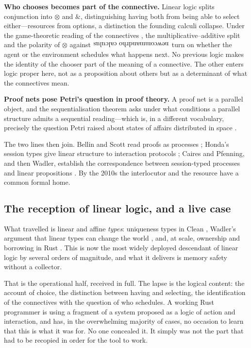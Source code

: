 \documentclass[11pt,a4paper]{article}
\newcommand{\parr}{\rotatebox[origin=c]{180}{\\newcommand{\rhoc}}}
\newcommand{\rhoc}{rho calculus}
\begin{document}
\textbf{Who chooses becomes part of the connective.} Linear logic splits
conjunction into $\otimes$ and $\&$, distinguishing having both from being able
to select either---resources from options, a distinction the founding calculi
collapse. Under the game-theoretic reading of the connectives
\cite{blass1992,abramsky1994}, the multiplicative--additive split and the
polarity of $\otimes$ against $\parr$ turn on whether the agent or the
environment schedules what happens next. No previous logic makes the identity of
the chooser part of the meaning of a connective. The other enters logic proper
here, not as a proposition about others but as a determinant of what the
connectives mean.

\textbf{Proof nets pose Petri's question in proof theory.} A proof net is a
parallel object, and the sequentialisation theorem asks under what conditions a
parallel structure admits a sequential reading---which is, in a different
vocabulary, precisely the question Petri raised about states of affairs
distributed in space \cite{petri1962}.

The two lines then join. Bellin and Scott read proofs as processes
\cite{bellinscott1994}; Honda's session types give linear structure to
interaction protocols \cite{honda1993}; Caires and Pfenning, and then Wadler,
establish the correspondence between session-typed processes and linear
propositions \cite{cairespfenning2010,wadler2012}. By the 2010s the interlocutor
and the resource have a common formal home.

\subsection{The reception of linear logic, and a live case}

What travelled is linear and affine \emph{types}: uniqueness types in Clean
\cite{barendsen1996}, Wadler's argument that linear types can change the world
\cite{wadler1990}, and, at scale, ownership and borrowing in Rust
\cite{jung2018}. This is now the most widely deployed descendant of linear logic
by several orders of magnitude, and what it delivers is memory safety without a
collector.

That is the operational half, received in full. The lapse is the logical content:
the account of choice, the distinction between having and selecting, the
identification of the connectives with the question of who schedules. A working
Rust programmer is using a fragment of a system proposed as a logic of action and
interaction, and has, in the overwhelming majority of cases, no occasion to learn
that this is what it was for. No one concealed it. It simply was not the part
that had to be recopied in order for the tool to work.
\end{document}
